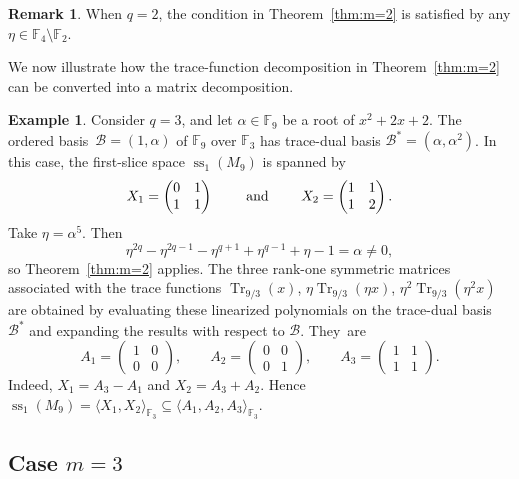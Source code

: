 \documentclass[11pt,a4paper,reqno]{article}
\numberwithin{equation}{section}
\theoremstyle{definition}
\newtheorem{example}[theorem]{Example}
\newtheorem{remark}[theorem]{Remark}
\newcommand{\numberset}{\mathbb}
\newcommand{\F}{\numberset{F}}
\begin{document}
\begin{remark}
When \(q=2\), the condition in Theorem~\ref{thm:m=2} is satisfied by any
\(\eta\in\mathbb F_4\setminus\mathbb F_2\).
\end{remark}

We now illustrate how the trace-function decomposition in Theorem~\ref{thm:m=2}
can be converted into a matrix decomposition.

\begin{example}
Consider \(q=3\), and let \(\alpha\in\mathbb F_9\) be a root of
\(x^2+2x+2\). The ordered basis~\(\mathcal{B}=(1,\alpha)\) of \(\mathbb F_9\) over \(\mathbb F_3\) has
trace-dual basis \(\mathcal{B}^*=(\alpha,\alpha^2)\).
In this case, the first-slice space \(\operatorname{ss}_1(M_9)\) is spanned by
\[ 
X_1=\begin{pmatrix}
    0&1\\1&1
\end{pmatrix}\qquad\textup{ and }\qquad
X_2=\begin{pmatrix}
    1&1\\1&2
\end{pmatrix}.\]
Take \(\eta=\alpha^5\). Then
\[
\eta^{2q}-\eta^{2q-1}-\eta^{q+1}+\eta^{q-1}+\eta-1=\alpha\neq 0,
\]
so Theorem~\ref{thm:m=2} applies. The three rank-one symmetric matrices associated with the trace functions $\operatorname{Tr}_{9/3}(x)$, $
\eta\operatorname{Tr}_{9/3}(\eta x)$,
$\eta^2\operatorname{Tr}_{9/3}(\eta^2 x)$ are obtained by evaluating these linearized polynomials on the trace-dual basis
\(\mathcal{B}^*\) and expanding the results with respect to \(\mathcal{B}\). They~are
\[ A_1=\begin{pmatrix}
    1&0\\0&0
\end{pmatrix},\qquad A_2=\begin{pmatrix}
    0&0\\0&1
\end{pmatrix},\qquad A_3=\begin{pmatrix}
    1&1\\1&1
\end{pmatrix}. \]
Indeed, $X_1=A_3-A_1$ and $X_2=A_3+A_2$. Hence $\operatorname{ss}_1(M_9)= \langle X_1,X_2\rangle_{\F_3}
\subseteq
\langle A_1,A_2,A_3\rangle_{\mathbb F_3}$.
\end{example}

\subsection{Case $m=3$}
\end{document}
